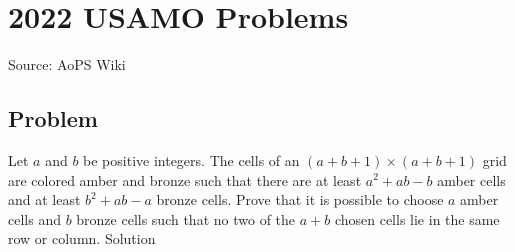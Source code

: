 \documentclass[12pt]{article}
\begin{document}
\section*{{2022 USAMO Problems}}
Source: AoPS Wiki

\subsection*{Problem}
Let $a$ and $b$ be positive integers. The cells of an $(a+b+1)\times (a+b+1)$ grid are colored amber and bronze such that there are at least $a^2+ab-b$ amber cells and at least $b^2+ab-a$ bronze cells. Prove that it is possible to choose $a$ amber cells and $b$ bronze cells such that no two of the $a+b$ chosen cells lie in the same row or column. Solution
\end{document}
